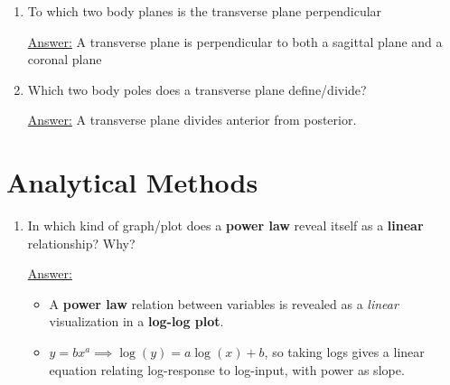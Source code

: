 \documentclass{article}
\newenvironment{QandA}{\begin{enumerate}[label=\bfseries Q\arabic*.]}
                       {\end{enumerate}}
\newenvironment{answered}{\par\normalfont\underline{Answer:}}{}
\begin{document}
\begin{QandA}
    \begin{answered}
    The sagittal plane defines/divides the left and right. Any non-median sagittal plane implies a lateral vs. medial division.
    \end{answered}
  \item{To which two body planes is the transverse plane perpendicular}
    \begin{answered}
    A transverse plane is perpendicular to both a sagittal plane and a coronal plane
    \end{answered}
  \item{Which two body poles does a transverse plane define/divide?}
    \begin{answered}
    A transverse plane divides anterior from posterior.
    \end{answered}
\end{QandA}
\section{Analytical Methods}
\begin{QandA}
  \item{In which kind of graph/plot does a \textbf{power law} reveal itself as a \textbf{linear} relationship? Why?}
    \begin{answered}
    \begin{itemize}
      \item{A \textbf{power law} relation between variables is revealed as a \textit{linear} visualization in a \textbf{log-log plot}.}
      \item{$y = b x^a \implies \operatorname{log}(y) = a \operatorname{log}(x) + b$, so taking logs gives a linear equation relating log-response to log-input, with power as slope.}
    \end{itemize}
    \end{answered}
\end{QandA}
\end{document}
